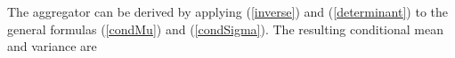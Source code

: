 \documentclass[11pt,twoside]{article}
\begin{document}

The aggregator can be derived by applying (\ref{inverse}) and (\ref{determinant}) to the general formulas (\ref{condMu}) and (\ref{condSigma}). The resulting conditional mean and variance are 
%
\end{document}
